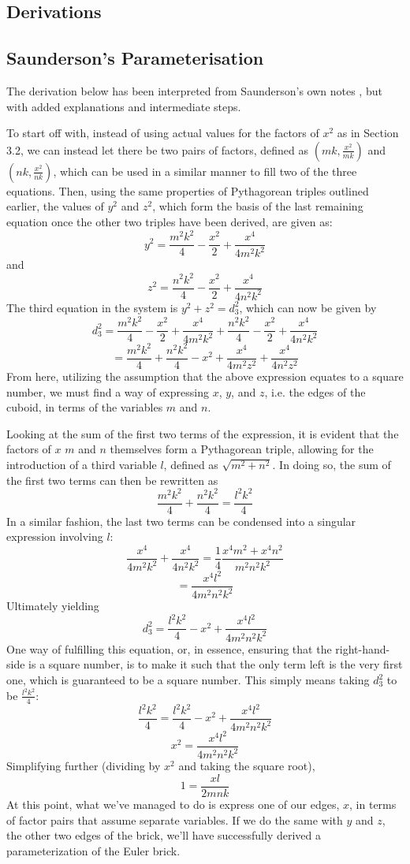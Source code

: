 \documentclass[11pt]{article}
\begin{document}
\newpage

 

\newpage
\begin{appendices}
	
\section{Derivations}
\label{appendix:misc}
\subsection{Saunderson's Parameterisation}
The derivation below has been interpreted from Saunderson's own notes \cite{saunderson}, but with added explanations and intermediate steps.

To start off with, instead of using actual values for the factors of $x^2$ as in Section 3.2, we can instead let there be two pairs of factors, defined as $(mk, \frac{x^2}{mk})$ and $(nk, \frac{x^2}{nk})$, which can be used in a similar manner to fill two of the three equations. Then, using the same properties of Pythagorean triples outlined earlier, the values of $y^2$ and $z^2$, which form the basis of the last remaining equation once the other two triples have been derived, are given as:
$$y^2=\frac{m^2k^2}{4}-\frac{x^2}{2}+\frac{x^4}{4m^2k^2}$$
and 
$$z^2=\frac{n^2k^2}{4}-\frac{x^2}{2}+\frac{x^4}{4n^2k^2}$$
The third equation in the system is $y^2+z^2=d_3^2$, which can now be given by 
$$d_3^2=\frac{m^2k^2}{4}-\frac{x^2}{2}+\frac{x^4}{4m^2k^2}+\frac{n^2k^2}{4}-\frac{x^2}{2}+\frac{x^4}{4n^2k^2}$$
$$=\frac{m^2k^2}{4}+\frac{n^2k^2}{4}-x^2+\frac{x^4}{4m^2z^2}+\frac{x^4}{4n^2z^2}$$
From here, utilizing the assumption that the above expression equates to a square number, we must find a way of expressing $x$, $y$, and $z$, i.e. the edges of the cuboid, in terms of the variables $m$ and $n$.

Looking at the sum of the first two terms of the expression, it is evident that the factors of $x$ $m$ and $n$ themselves form a Pythagorean triple, allowing for the introduction of a third variable $l$, defined as $\sqrt{m^2+n^2}$. In doing so, the sum of the first two terms can then be rewritten as
$$\frac{m^2k^2}{4}+\frac{n^2k^2}{4}=\frac{l^2k^2}{4}$$
In a similar fashion, the last two terms can be condensed into a singular expression involving $l$:
$$\frac{x^4}{4m^2k^2}+\frac{x^4}{4n^2k^2}=\frac{1}{4}\frac{x^4m^2+x^4n^2}{m^2n^2k^2}$$
$$=\frac{x^4l^2}{4m^2n^2k^2}$$
Ultimately yielding
$$d_3^2=\frac{l^2k^2}{4}-x^2+\frac{x^4l^2}{4m^2n^2k^2}$$
One way of fulfilling this equation, or, in essence, ensuring that the right-hand-side is a square number, is to make it such that the only term left is the very first one, which is guaranteed to be a square number. This simply means taking $d_3^2$ to be $\frac{l^2k^2}{4}$:
$$\frac{l^2k^2}{4}=\frac{l^2k^2}{4}-x^2+\frac{x^4l^2}{4m^2n^2k^2}$$
$$x^2=\frac{x^4l^2}{4m^2n^2k^2}$$
Simplifying further (dividing by $x^2$ and taking the square root), 
$$1=\frac{xl}{2mnk}$$
At this point, what we've managed to do is express one of our edges, $x$, in terms of factor pairs that assume separate variables. If we do the same with $y$ and $z$, the other two edges of the brick, we'll have successfully derived a parameterization of the Euler brick. 


\end{appendices}
\end{document}
